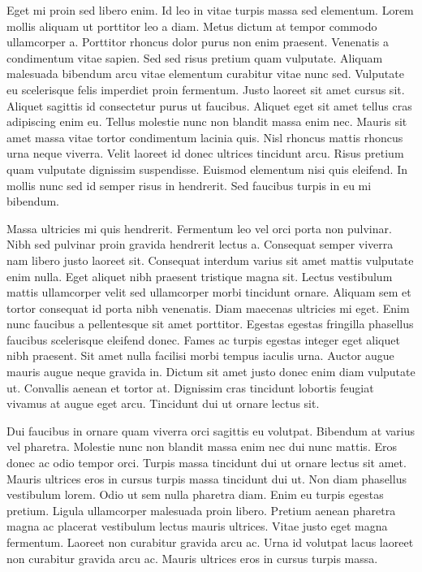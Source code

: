 \documentclass[11pt,a4paper]{article}
\begin{document}
Eget mi proin sed libero enim. Id leo in vitae turpis massa sed elementum. Lorem mollis aliquam ut porttitor leo a diam. Metus dictum at tempor commodo ullamcorper a. Porttitor rhoncus dolor purus non enim praesent. Venenatis a condimentum vitae sapien. Sed sed risus pretium quam vulputate. Aliquam malesuada bibendum arcu vitae elementum curabitur vitae nunc sed. Vulputate eu scelerisque felis imperdiet proin fermentum. Justo laoreet sit amet cursus sit. Aliquet sagittis id consectetur purus ut faucibus. Aliquet eget sit amet tellus cras adipiscing enim eu. Tellus molestie nunc non blandit massa enim nec. Mauris sit amet massa vitae tortor condimentum lacinia quis. Nisl rhoncus mattis rhoncus urna neque viverra. Velit laoreet id donec ultrices tincidunt arcu. Risus pretium quam vulputate dignissim suspendisse. Euismod elementum nisi quis eleifend. In mollis nunc sed id semper risus in hendrerit. Sed faucibus turpis in eu mi bibendum.

Massa ultricies mi quis hendrerit. Fermentum leo vel orci porta non pulvinar. Nibh sed pulvinar proin gravida hendrerit lectus a. Consequat semper viverra nam libero justo laoreet sit. Consequat interdum varius sit amet mattis vulputate enim nulla. Eget aliquet nibh praesent tristique magna sit. Lectus vestibulum mattis ullamcorper velit sed ullamcorper morbi tincidunt ornare. Aliquam sem et tortor consequat id porta nibh venenatis. Diam maecenas ultricies mi eget. Enim nunc faucibus a pellentesque sit amet porttitor. Egestas egestas fringilla phasellus faucibus scelerisque eleifend donec. Fames ac turpis egestas integer eget aliquet nibh praesent. Sit amet nulla facilisi morbi tempus iaculis urna. Auctor augue mauris augue neque gravida in. Dictum sit amet justo donec enim diam vulputate ut. Convallis aenean et tortor at. Dignissim cras tincidunt lobortis feugiat vivamus at augue eget arcu. Tincidunt dui ut ornare lectus sit.

Dui faucibus in ornare quam viverra orci sagittis eu volutpat. Bibendum at varius vel pharetra. Molestie nunc non blandit massa enim nec dui nunc mattis. Eros donec ac odio tempor orci. Turpis massa tincidunt dui ut ornare lectus sit amet. Mauris ultrices eros in cursus turpis massa tincidunt dui ut. Non diam phasellus vestibulum lorem. Odio ut sem nulla pharetra diam. Enim eu turpis egestas pretium. Ligula ullamcorper malesuada proin libero. Pretium aenean pharetra magna ac placerat vestibulum lectus mauris ultrices. Vitae justo eget magna fermentum. Laoreet non curabitur gravida arcu ac. Urna id volutpat lacus laoreet non curabitur gravida arcu ac. Mauris ultrices eros in cursus turpis massa.
\end{document}
